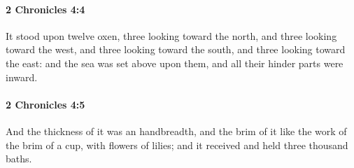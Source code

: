 		\paragraph{2 Chronicles 4:4} %
			\label{2CHRONICLES-4-4}

			It stood upon twelve oxen, three looking toward the north, and three looking toward the west, and three looking toward the south, and three looking toward the east: and the sea was set above upon them, and all their hinder parts were inward.


		\paragraph{2 Chronicles 4:5} %
			\label{2CHRONICLES-4-5}

			And the thickness of it was an handbreadth, and the brim of it like the work of the brim of a cup, with flowers of lilies; and it received and held three thousand baths.

